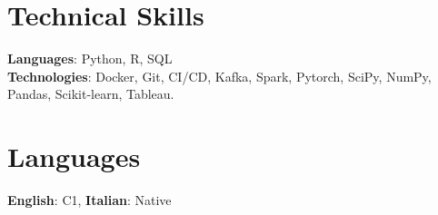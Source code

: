\resumeSubHeadingListEnd


\section{Technical Skills}
    \begin{itemize}[leftmargin=0.15in, label={}]
	\small{\item{
		\textbf{Languages}{: Python, R, SQL} \\
		\textbf{Technologies}{: Docker, Git, CI/CD, Kafka, Spark, Pytorch, SciPy, NumPy, Pandas, Scikit-learn, Tableau.} \\}}
    \end{itemize}

\section{Languages}
     \begin{itemize}[leftmargin=0.15in, label={}]
 	\small{\item{
 		\textbf{English}: C1, \textbf{Italian}: Native }}
     \end{itemize}

\clearpage


